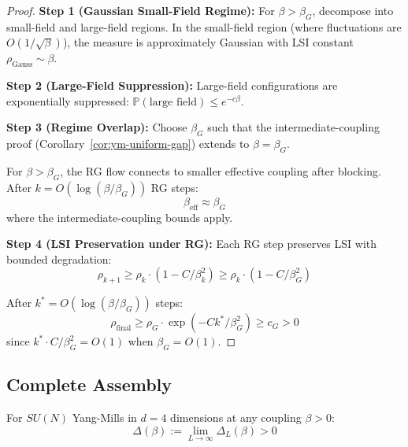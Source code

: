 \begin{proof}
\textbf{Step 1 (Gaussian Small-Field Regime):}
For $\beta > \beta_G$, decompose into small-field and large-field regions.
In the small-field region (where fluctuations are $O(1/\sqrt{\beta})$), 
the measure is approximately Gaussian with LSI constant $\rho_{\mathrm{Gauss}} \sim \beta$.

\textbf{Step 2 (Large-Field Suppression):}
Large-field configurations are exponentially suppressed: 
$\mathbb{P}(\text{large field}) \leq e^{-c\beta}$.

\textbf{Step 3 (Regime Overlap):}
Choose $\beta_G$ such that the intermediate-coupling proof 
(Corollary~\ref{cor:ym-uniform-gap}) extends to $\beta = \beta_G$.

For $\beta > \beta_G$, the RG flow connects to smaller effective coupling 
after blocking. After $k = O(\log(\beta/\beta_G))$ RG steps:
\[
\beta_{\mathrm{eff}} \approx \beta_G
\]
where the intermediate-coupling bounds apply.

\textbf{Step 4 (LSI Preservation under RG):}
Each RG step preserves LSI with bounded degradation:
\[
\rho_{k+1} \geq \rho_k \cdot (1 - C/\beta_k^2) \geq \rho_k \cdot (1 - C/\beta_G^2)
\]

After $k^* = O(\log(\beta/\beta_G))$ steps:
\[
\rho_{\mathrm{final}} \geq \rho_G \cdot \exp(-C k^*/\beta_G^2) \geq c_G > 0
\]
since $k^* \cdot C/\beta_G^2 = O(1)$ when $\beta_G = O(1)$.
\end{proof}

\subsection{Complete Assembly}

\begin{theorem}
\label{thm:complete-mass-gap-all-beta}
For $SU(N)$ Yang-Mills in $d=4$ dimensions at any coupling $\beta > 0$:
\[
\Delta(\beta) := \lim_{L \to \infty} \Delta_L(\beta) > 0
\]
\end{theorem}

